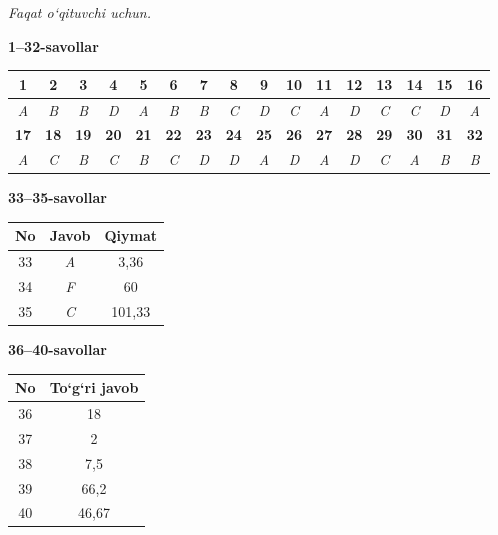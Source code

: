 \documentclass[11pt,a4paper]{article}
\begin{document}
\textit{Faqat o`qituvchi uchun.}\par\medskip
\noindent\textbf{1--32-savollar}\par\smallskip
\noindent\begin{tabular}{|c|c|c|c|c|c|c|c|c|c|c|c|c|c|c|c|}\hline
\textbf{1} & \textbf{2} & \textbf{3} & \textbf{4} & \textbf{5} & \textbf{6} & \textbf{7} & \textbf{8} & \textbf{9} & \textbf{10} & \textbf{11} & \textbf{12} & \textbf{13} & \textbf{14} & \textbf{15} & \textbf{16}\\\hline
\textsl{A} & \textsl{B} & \textsl{B} & \textsl{D} & \textsl{A} & \textsl{B} & \textsl{B} & \textsl{C} & \textsl{D} & \textsl{C} & \textsl{A} & \textsl{D} & \textsl{C} & \textsl{C} & \textsl{D} & \textsl{A}\\\hline
\textbf{17} & \textbf{18} & \textbf{19} & \textbf{20} & \textbf{21} & \textbf{22} & \textbf{23} & \textbf{24} & \textbf{25} & \textbf{26} & \textbf{27} & \textbf{28} & \textbf{29} & \textbf{30} & \textbf{31} & \textbf{32}\\\hline
\textsl{A} & \textsl{C} & \textsl{B} & \textsl{C} & \textsl{B} & \textsl{C} & \textsl{D} & \textsl{D} & \textsl{A} & \textsl{D} & \textsl{A} & \textsl{D} & \textsl{C} & \textsl{A} & \textsl{B} & \textsl{B}\\\hline
\end{tabular}\par\medskip
\noindent\textbf{33--35-savollar}\par\smallskip
\noindent\begin{tabular}{|c|c|c|}\hline \textbf{No} & \textbf{Javob} & \textbf{Qiymat}\\\hline
33 & \textsl{A} & 3,36\\\hline
34 & \textsl{F} & 60\\\hline
35 & \textsl{C} & 101,33\\\hline
\end{tabular}\par\medskip
\noindent\textbf{36--40-savollar}\par\smallskip
\noindent\begin{tabular}{|c|c|}\hline \textbf{No} & \textbf{To`g`ri javob}\\\hline
36 & 18\\\hline
37 & 2\\\hline
38 & 7,5\\\hline
39 & 66,2\\\hline
40 & 46,67\\\hline
\end{tabular}\par\medskip
\end{document}

